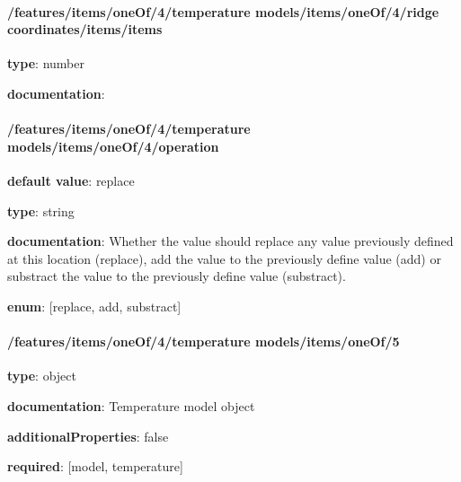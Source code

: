 \begin{itemized}
\begin{itemized}
\paragraph{/features/items/oneOf/4/temperature models/items/oneOf/4/ridge coordinates/items/items} \begin{itemized}
\item {\bf type}: number
\end{itemized}\item {\bf documentation}: 
\end{itemized}\end{itemized}\paragraph{/features/items/oneOf/4/temperature models/items/oneOf/4/operation} \begin{itemized}
\item {\bf default value}: replace
\item {\bf type}: string
\item {\bf documentation}: Whether the value should replace any value previously defined at this location (replace), add the value to the previously define value (add) or substract the value to the previously define value (substract).
\item {\bf enum}: [replace, add, substract]\end{itemized}\paragraph{/features/items/oneOf/4/temperature models/items/oneOf/5} \begin{itemized}
\item {\bf type}: object
\item {\bf documentation}: Temperature model object
\item {\bf additionalProperties}: false
\item {\bf required}: [model, temperature]\end{itemized}
